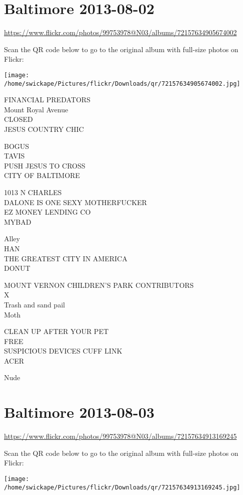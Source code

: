 \documentclass[10pt,letterpaper]{article}
\title{}
\author{}
\date{}
\begin{document}
\section*{Baltimore 2013-08-02}

\url{https://www.flickr.com/photos/99753978@N03/albums/72157634905674002}

Scan the QR code below to go to the original album with full-size photos on Flickr:

\texttt{[image: /home/swickape/Pictures/flickr/Downloads/qr/72157634905674002.jpg]}


FINANCIAL PREDATORS\\
Mount Royal Avenue\\
CLOSED\\
JESUS COUNTRY CHIC

BOGUS\\
TAVIS\\
PUSH JESUS TO CROSS\\
CITY OF BALTIMORE

1013 N CHARLES\\
DALONE IS ONE SEXY MOTHERFUCKER\\
EZ MONEY LENDING CO\\
MYBAD

Alley\\
HAN\\
THE GREATEST CITY IN AMERICA\\
DONUT

MOUNT VERNON CHILDREN'S PARK CONTRIBUTORS\\
X\\
Trash and sand pail\\
Moth

CLEAN UP AFTER YOUR PET\\
FREE\\
SUSPICIOUS DEVICES CUFF LINK\\
ACER

Nude


\section*{Baltimore 2013-08-03}

\url{https://www.flickr.com/photos/99753978@N03/albums/72157634913169245}

Scan the QR code below to go to the original album with full-size photos on Flickr:

\texttt{[image: /home/swickape/Pictures/flickr/Downloads/qr/72157634913169245.jpg]}
\end{document}
